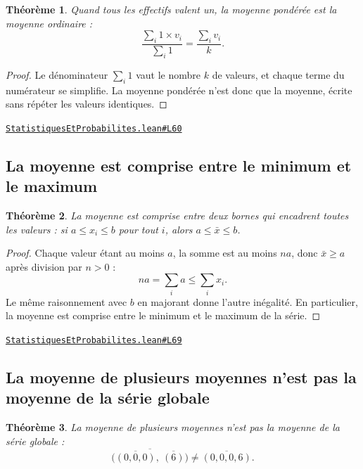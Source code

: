 \documentclass[11pt,a4paper]{article}
\theoremstyle{definition}
\theoremstyle{plain}
\newtheorem{theoreme}{Théorème}
\newcommand{\source}[2]{\par\smallskip\noindent\hfill{\footnotesize\href{#1}{\texttt{#2}}}\par\smallskip}
\begin{document}
\begin{theoreme}
Quand tous les effectifs valent un, la moyenne pondérée est la moyenne ordinaire :
\[ \frac{\sum_i 1 \times v_i}{\sum_i 1} = \frac{\sum_i v_i}{k} . \]
\end{theoreme}

\begin{proof}
Le dénominateur $\sum_i 1$ vaut le nombre $k$ de valeurs, et chaque terme du numérateur
se simplifie. La moyenne pondérée n'est donc que la moyenne, écrite sans répéter les
valeurs identiques.
\end{proof}
\source{https://github.com/Commutator-IO/learn-lean/blob/main/cours/01-college/06-statistiques-et-probabilites/StatistiquesEtProbabilites.lean\#L60}{StatistiquesEtProbabilites.lean\#L60}

\subsection{La moyenne est comprise entre le minimum et le maximum}

\begin{theoreme}
La moyenne est comprise entre deux bornes qui encadrent toutes les valeurs : si
$a \le x_i \le b$ pour tout $i$, alors $a \le \bar{x} \le b$.
\end{theoreme}

\begin{proof}
Chaque valeur étant au moins $a$, la somme est au moins $na$, donc $\bar{x} \ge a$
après division par $n > 0$ :
\[ na = \sum_i a \le \sum_i x_i . \]
Le même raisonnement avec $b$ en majorant donne l'autre inégalité. En particulier, la
moyenne est comprise entre le minimum et le maximum de la série.
\end{proof}
\source{https://github.com/Commutator-IO/learn-lean/blob/main/cours/01-college/06-statistiques-et-probabilites/StatistiquesEtProbabilites.lean\#L69}{StatistiquesEtProbabilites.lean\#L69}

\subsection{La moyenne de plusieurs moyennes n'est pas la moyenne de la série globale}

\begin{theoreme}
La moyenne de plusieurs moyennes n'est pas la moyenne de la série globale :
\[ \overline{\bigl(\overline{(0,0,0)},\ \overline{(6)}\bigr)} \ne \overline{(0,0,0,6)} . \]
\end{theoreme}
\end{document}

